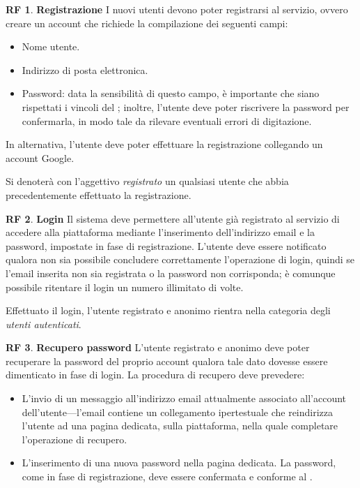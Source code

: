 \documentclass[11pt, a4paper]{article}
\theoremstyle{definition}
\newtheorem{funcreq}{RF} %
\begin{document}
\begin{funcreq}
\label{signup}
\textbf{Registrazione }
I nuovi utenti devono poter registrarsi al servizio, ovvero creare un account che
richiede la compilazione dei seguenti campi:
\begin{itemize}
    \item Nome utente.
    \item Indirizzo di posta elettronica.
    \item Password: data la sensibilità di questo campo, è importante
    che siano rispettati i vincoli del \textcolor{blue}{};
    inoltre, l'utente deve poter riscrivere la password per confermarla, in
    modo tale da rilevare eventuali errori di digitazione.
\end{itemize}
In alternativa, l'utente deve poter effettuare la registrazione collegando un account
Google.
\end{funcreq}

\noindent Si denoterà con l'aggettivo \textit{registrato} un qualsiasi
utente che abbia precedentemente effettuato la registrazione.

\begin{funcreq}
\label{login}
\textbf{Login }
Il sistema deve permettere all'utente già registrato al servizio di
accedere alla piattaforma mediante l'inserimento dell'indirizzo
email e la password, impostate in fase di registrazione. L'utente deve
essere notificato qualora non sia possibile concludere correttamente
l'operazione di login, quindi se l'email inserita non sia registrata o
la password non corrisponda; è comunque possibile ritentare il login un
numero illimitato di volte.
\end{funcreq}

\noindent
Effettuato il login, l'utente registrato e anonimo rientra nella categoria degli
\textit{utenti autenticati}.

\begin{funcreq}
\label{savepassword}
\textbf{Recupero password }
L'utente registrato e anonimo deve poter recuperare la password del proprio
account qualora tale dato dovesse essere dimenticato in fase di login. La
procedura di recupero deve prevedere:
\begin{itemize}
    \item L'invio di un messaggio all'indirizzo email attualmente associato
    all'account dell'utente—l'email contiene un collegamento ipertestuale
    che reindirizza l'utente ad una pagina dedicata, sulla piattaforma, nella
    quale completare l'operazione di recupero.

    \item L'inserimento di una nuova password nella pagina dedicata. La password, come in fase di
    registrazione, deve essere confermata e conforme al \textcolor{blue}{}.
\end{itemize}

\end{funcreq}
\end{document}

